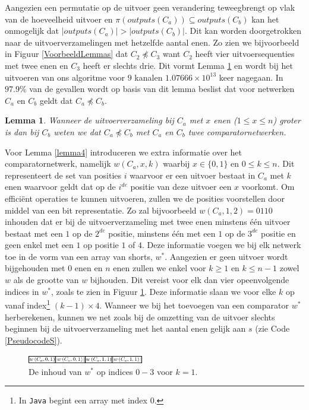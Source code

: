 \documentclass{article}
\newtheorem{lemma}{Lemma}
\begin{document}
Aangezien een permutatie op de uitvoer geen verandering teweegbrengt op vlak van de hoeveelheid uitvoer en ${\pi(outputs(C_a)) \subseteq outputs(C_b)}$ kan het onmogelijk dat ${|outputs(C_a)| > |outputs(C_b)|}$.
Dit kan worden doorgetrokken naar de uitvoerverzamelingen met hetzelfde aantal enen.
Zo zien we bijvoorbeeld in Figuur \ref{VoorbeeldLemmas} dat $C_2 \npreceq C_3$ want $C_2$ heeft vier uitvoersequenties met twee enen en $C_3$ heeft er slechts drie.
Dit vormt Lemma \ref{lemma3} en wordt bij het uitvoeren van ons algoritme voor $9$ kanalen $1.07666 \times 10^{13}$ keer nagegaan.
In $97.9\%$ van de gevallen wordt op basis van dit lemma beslist dat voor netwerken $C_a$ en $C_b$ geldt dat $C_a \npreceq C_b$.
\begin{lemma}
	Wanneer de uitvoerverzameling bij $C_a$ met $x$ enen ($1 \leq x \leq n$) groter is dan bij $C_b$ weten we dat $C_a \npreceq C_b$ met $C_a$ en $C_b$ twee comparatornetwerken.
\label{lemma3}
\end{lemma}
Voor Lemma \ref{lemma4} introduceren we extra informatie over het comparatornetwerk, namelijk $w\left(C_a, x, k\right)$ waarbij ${x \in \{0,1\}}$ en $0\leq k \leq n$.
Dit representeert de set van posities $i$ waarvoor er een uitvoer bestaat in $C_a$ met $k$ enen waarvoor geldt dat op de $i^{de}$ positie van deze uitvoer een $x$ voorkomt.
Om effici\"ent operaties te kunnen uitvoeren, zullen we de posities voorstellen door middel van een bit representatie.
Zo zal bijvoorbeeld $w\left(C_a, 1, 2\right) = 0110$ inhouden dat er bij de uitvoerverzameling met twee enen minstens \'e\'en uitvoer bestaat met een $1$ op de $2^{de}$ positie, minstens \'e\'en met een $1$ op de $3^{de}$ positie en geen enkel met een $1$ op positie $1$ of $4$.
Deze informatie voegen we bij elk netwerk toe in de vorm van een array van shorts, $w^*$.
Aangezien er geen uitvoer wordt bijgehouden met $0$ enen en $n$ enen zullen we enkel voor $k \geq 1 $ en $k \leq n-1$ zowel $w$ als de grootte van $w$ bijhouden.
Dit vereist voor elk dan vier opeenvolgende indices in $w^*$, zoals te zien in Figuur \ref{tabel3}.
Deze informatie slaan we voor elke $k$ op vanaf index\footnote{In \texttt{Java} begint een array met index $0$.} $(k-1) \times 4$.
Wanneer we bij het toevoegen van een comparator $w^*$ herberekenen, kunnen we net zoals bij de omzetting van de uitvoer slechts beginnen bij de uitvoerverzameling met het aantal enen gelijk aan $s$ (zie Code \ref{PseudocodeS}).
\begin{figure}[!h]
	\vspace{-5pt}
	\centering
	\includegraphics[width = 0.45\textwidth]{Tabel3_OpbouwW.png}
	\caption{De inhoud van $w^*$ op indices $0-3$ voor $k = 1$.}
	\label{tabel3} 
	\vspace{-10pt}
\end{figure}
\end{document}
